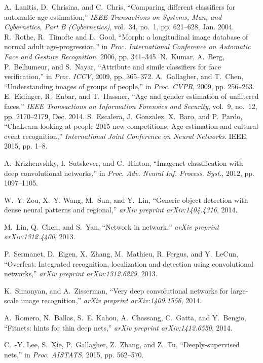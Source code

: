 \documentclass[journal]{IEEEtran}
\begin{document}
\begin{thebibliography}{1}
A.~Lanitis, D.~Chrisina, and C.~Chris, ``Comparing different classifiers for automatic age estimation,'' \emph{IEEE Transactions on Systems, Man, and Cybernetics, Part B (Cybernetics)}, vol.~34, no.~1,
  pp. 621--628, Jan. 2004.
R.~Rothe, R.~Timofte and L.~Gool, ``Morph: a longitudinal image database of normal adult age-progression,'' in \emph{Proc. International Conference on Automatic Face and Gesture Recognition}, 2006, pp. 341--345.
N.~Kumar, A.~Berg, P.~Belhumeur, and S.~Nayar, ``Attribute and simile classifiers for face verification,'' in \emph{Proc. ICCV}, 2009, pp. 365--372.
A.~Gallagher, and T.~Chen, ``Understanding images of groups of people,'' in \emph{Proc. CVPR}, 2009, pp. 256--263.
E.~Eidinger, R.~Enbar, and T.~Hassner, ``Age and gender estimation of unfiltered faces,'' \emph{IEEE Transactions on Information Forensics and Security}, vol.~9, no.~12,
  pp. 2170--2179, Dec. 2014.
 S.~Escalera, J.~Gonzalez, X.~Baro, and P.~Pardo, ``ChaLearn looking at people 2015 new competitions: Age estimation and cultural event recognition,''\emph{ International Joint Conference on Neural Networks}. IEEE, 2015, pp. 1--8.

A.~Krizhenvshky, I.~Sutskever, and G.~Hinton, ``Imagenet classification with deep convolutional networks,'' in
  \emph{Proc. Adv. Neural Inf. Process. Syst.}, 2012, pp. 1097--1105.

W.~Y. Zou, X.~Y. Wang, M.~Sun, and Y.~Lin, ``Generic object detection with dense neural patterns and regional,'' \emph{arXiv preprint arXiv:1404.4316}, 2014.

M.~Lin, Q.~Chen, and S.~Yan, ``Network in network,'' \emph{arXiv preprint arXiv:1312.4400}, 2013.

P.~Sermanet, D.~Eigen, X.~Zhang, M.~Mathieu, R. Fergus, and Y.~LeCun, ``Overfeat: Integrated recognition, localization and detection using convolutional networks,'' \emph{arXiv preprint arXiv:1312.6229}, 2013.

K.~Simonyan, and A.~Zisserman, ``Very deep convolutional networks for large-scale image recognition,'' \emph{arXiv preprint arXiv:1409.1556}, 2014.

A.~Romero, N.~Ballas, S.~E. Kahou, A.~Chassang, C.~Gatta, and Y.~Bengio, ``Fitnets: hints for thin deep nets,'' \emph{arXiv preprint arXiv:1412.6550}, 2014.

C.~-Y. Lee, S.~Xie, P.~Gallagher, Z.~Zhang, and Z.~Tu, ``Deeply-supervised nets,'' in
  \emph{Proc. AISTATS}, 2015, pp. 562--570.


\end{thebibliography}
\end{document}
